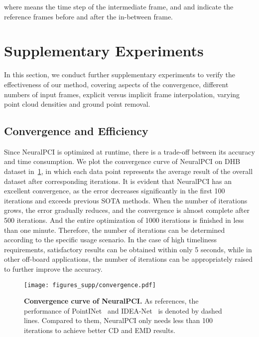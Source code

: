 \documentclass[10pt,twocolumn,letterpaper]{article}
\begin{document}
\vspace{-0.5cm}

where  means the time step of the intermediate frame, and  and  indicate the reference frames before and after the in-between frame. 




\section{Supplementary Experiments}
\label{sec:appendix experiments}

In this section, we conduct further supplementary experiments to verify the effectiveness of our method, covering aspects of the convergence, different numbers of input frames, explicit versus implicit frame interpolation, varying point cloud densities and ground point removal.




\subsection{Convergence and Efficiency}

Since NeuralPCI is optimized at runtime, there is a trade-off between its accuracy and time consumption. We plot the convergence curve of NeuralPCI on DHB dataset in~\cref{fig:convergence}, in which each data point represents the average result of the overall dataset after corresponding iterations. It is evident that NeuralPCI has an excellent convergence, as the error decreases significantly in the first 100 iterations and exceeds previous SOTA methods. When the number of iterations grows, the error gradually reduces, and the convergence is almost complete after 500 iterations. And the entire optimization of 1000 iterations is finished in less than one minute. Therefore, the number of iterations can be determined according to the specific usage scenario. In the case of high timeliness requirements, satisfactory results can be obtained within only 5 seconds, while in other off-board applications, the number of iterations can be appropriately raised to further improve the accuracy. 


\begin{figure}[t]
\centering
  \texttt{[image: figures\_supp/convergence.pdf]}
  \caption{\textbf{Convergence curve of NeuralPCI.} As references, the performance of PointINet~\cite{lu2021pointinet} and IDEA-Net~\cite{zeng2022idea} is denoted by dashed lines. Compared to them, NeuralPCI only needs less than 100 iterations to achieve better CD and EMD results.}
  \label{fig:convergence}
\vspace{-.2cm}
\end{figure} 
\end{document}
